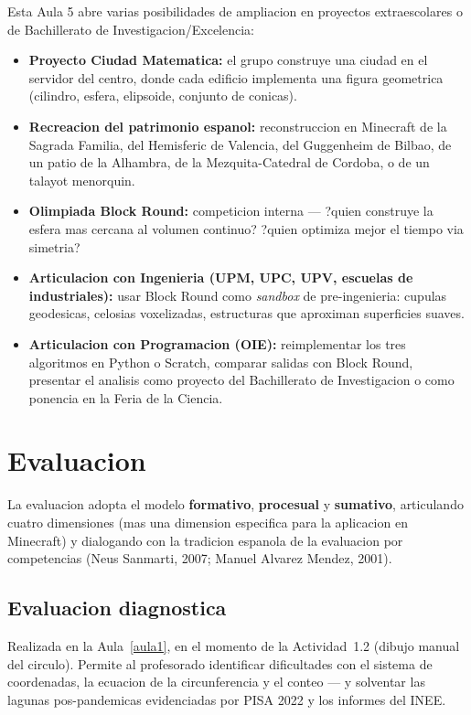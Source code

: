 \documentclass[12pt,a4paper]{scrartcl}
\newcommand{\acc}[1]{\textcolor{accent}{\textbf{#1}}}
\begin{document}
\begin{minecraft}
Esta Aula 5 abre varias posibilidades de ampliacion en proyectos extraescolares o de Bachillerato de Investigacion/Excelencia:
\begin{itemize}[leftmargin=1.3em,itemsep=0.15em,topsep=0.3em,nosep]
  \item \textbf{Proyecto Ciudad Matematica:} el grupo construye una ciudad en el servidor del centro, donde cada edificio implementa una figura geometrica (cilindro, esfera, elipsoide, conjunto de conicas).
  \item \textbf{Recreacion del patrimonio espanol:} reconstruccion en Minecraft de la Sagrada Familia, del Hemisferic de Valencia, del Guggenheim de Bilbao, de un patio de la Alhambra, de la Mezquita-Catedral de Cordoba, o de un talayot menorquin.
  \item \textbf{Olimpiada Block Round:} competicion interna --- ?quien construye la esfera mas cercana al volumen continuo? ?quien optimiza mejor el tiempo via simetria?
  \item \textbf{Articulacion con Ingenieria (UPM, UPC, UPV, escuelas de industriales):} usar Block Round como \emph{sandbox} de pre-ingenieria: cupulas geodesicas, celosias voxelizadas, estructuras que aproximan superficies suaves.
  \item \textbf{Articulacion con Programacion (OIE):} reimplementar los tres algoritmos en Python o Scratch, comparar salidas con Block Round, presentar el analisis como proyecto del Bachillerato de Investigacion o como ponencia en la Feria de la Ciencia.
\end{itemize}
\end{minecraft}

\section{Evaluacion}\label{sec:avaliacao}

La evaluacion adopta el modelo \acc{formativo}, \acc{procesual} y \acc{sumativo}, articulando cuatro dimensiones (mas una dimension especifica para la aplicacion en Minecraft) y dialogando con la tradicion espanola de la evaluacion por competencias (Neus Sanmarti, 2007; Manuel Alvarez Mendez, 2001).

\subsection{Evaluacion diagnostica}
Realizada en la Aula~\ref{aula1}, en el momento de la Actividad~1.2 (dibujo manual del circulo). Permite al profesorado identificar dificultades con el sistema de coordenadas, la ecuacion de la circunferencia y el conteo --- y solventar las lagunas pos-pandemicas evidenciadas por PISA 2022 y los informes del INEE.
\end{document}
